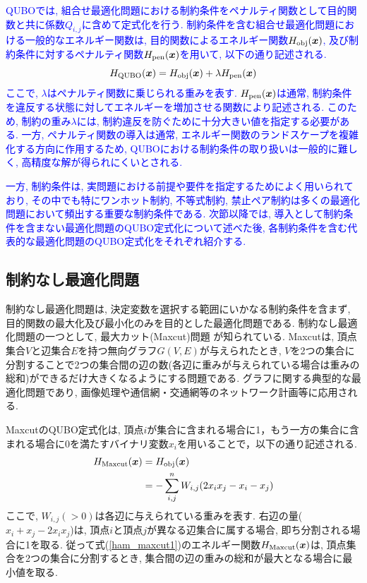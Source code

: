 \documentclass[submit,techrep,noauthor]{ipsj}
\begin{document}
\textcolor{blue}{QUBOでは, 組合せ最適化問題における制約条件をペナルティ関数として目的関数と共に係数$Q_{i,j}$に含めて定式化を行う. 制約条件を含む組合せ最適化問題における一般的なエネルギー関数は, 目的関数によるエネルギー関数$H_{\rm{obj}}(\bm{x})$, 及び制約条件に対するペナルティ関数$H_{\rm{pen}}(\bm{x})$を用いて, 以下の通り記述される.
\begin{equation}
H_{\rm{QUBO}}(\bm{x}) = H_{\rm{obj}}(\bm{x}) + \lambda H_{\rm{pen}}(\bm{x})
\label{H_qubo}
\end{equation}
ここで, $\lambda$はペナルティ関数に乗じられる重みを表す. $H_{\rm{pen}}(\bm{x})$は通常, 制約条件を違反する状態に対してエネルギーを増加させる関数により記述される. このため, 制約の重み$\lambda$には, 制約違反を防ぐために十分大きい値を指定する必要がある. 一方, ペナルティ関数の導入は通常, エネルギー関数のランドスケープを複雑化する方向に作用するため, QUBOにおける制約条件の取り扱いは一般的に難しく, 高精度な解が得られにくいとされる\cite{kumagai, komatsu, kumagai2}. } 

\textcolor{blue}{一方, 制約条件は, 実問題における前提や要件を指定するためによく用いられており, その中でも特にワンホット制約, 不等式制約, 禁止ペア制約は多くの最適化問題において頻出する重要な制約条件である. 次節以降では, 導入として制約条件を含まない最適化問題のQUBO定式化について述べた後, 各制約条件を含む代表的な最適化問題のQUBO定式化をそれぞれ紹介する.}

\subsection{制約なし最適化問題}

制約なし最適化問題は, 決定変数を選択する範囲にいかなる制約条件を含まず, 目的関数の最大化及び最小化のみを目的とした最適化問題である. 制約なし最適化問題の一つとして, 最大カット(Maxcut)問題 が知られている. Maxcutは, 頂点集合$V$と辺集合$E$を持つ無向グラフ$G(V,E)$が与えられたとき, $V$を2つの集合に分割することで2つの集合間の辺の数(各辺に重みが与えられている場合は重みの総和)ができるだけ大きくなるようにする問題である\cite{maxcut}. グラフに関する典型的な最適化問題であり, 画像処理や通信網・交通網等のネットワーク計画等に応用される.

MaxcutのQUBO定式化は, 頂点$i$が集合に含まれる場合に1，もう一方の集合に含まれる場合に0を満たすバイナリ変数$x_{i}$を用いることで，以下の通り記述される. 
\textcolor{blue}{
\begin{align}
H_{\rm{Maxcut}}(\bm{x}) &= H_{\rm{obj}}(\bm{x})\nonumber\\
&= -\sum_{i,j}^{n}W_{i,j}(2x_{i}x_{j}-x_{i}-x_{j})
\label{ham_maxcut1}
\end{align}
}
ここで, $W_{i,j}(>0)$は各辺に与えられている重みを表す. 右辺の量($x_{i}+x_{j}-2x_{i}x_{j}$)は, 頂点$i$と頂点$j$が異なる辺集合に属する場合, 即ち分割される場合に1を取る. 従って式(\ref{ham_maxcut1})のエネルギー関数$H_{\rm{Maxcut}}(\bm{x})$は, 頂点集合を2つの集合に分割するとき, 集合間の辺の重みの総和が最大となる場合に最小値を取る.
\end{document}
